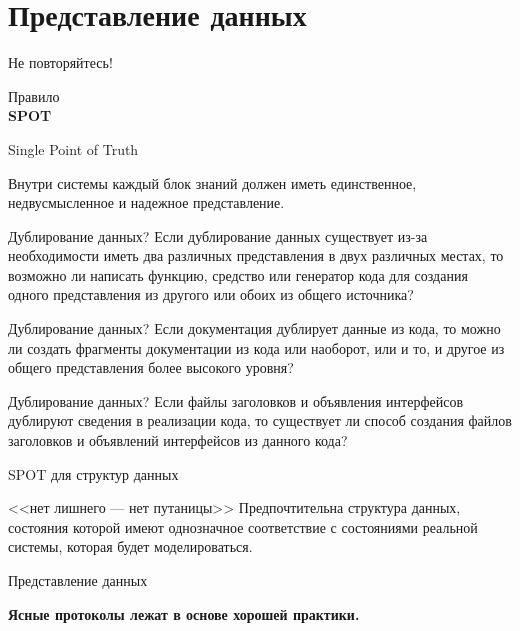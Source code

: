 \section{Представление данных}

\begin{frame}{Не повторяйтесь!}
	\begin{center}
	Правило\\
	{\Huge\bfseries SPOT}

	Single Point of Truth

	\end{center}
	\pause
	
	Внутри системы каждый блок знаний должен иметь единственное,  недвусмысленное и надежное представление.
\end{frame}


\begin{frame}{Дублирование данных?}
	Если дублирование данных существует из-за необходимости иметь два различных представления в 
	двух различных местах,  то возможно ли написать функцию,  средство или генератор кода для 
	создания одного представления из другого или обоих из общего источника?
\end{frame}

\begin{frame}{Дублирование данных?}
Если документация дублирует данные из кода,  то можно ли создать фрагменты документации 
из кода или наоборот,  или и то,  и другое из общего представления более высокого уровня?
\end{frame}

\begin{frame}{Дублирование данных?}
	Если файлы заголовков и объявления интерфейсов дублируют сведения в реализации кода,  
	то существует ли способ создания файлов заголовков и объявлений интерфейсов из данного кода?
\end{frame}

\begin{frame}{SPOT для структур данных}
	\begin{block}{<<нет лишнего — нет путаницы>>}
		Предпочтительна структура данных,  состояния которой имеют однозначное 
		соответствие с состояниями реальной системы,  которая будет моделироваться.
	\end{block}
\end{frame}

\begin{frame}{Представление данных}
	\begin{center}
	{\Large\bfseries Ясные протоколы лежат в основе хорошей практики.}
	\end{center}
\end{frame}

